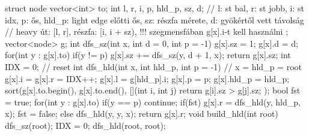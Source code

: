 struct node{
    vector<int> to;
    int l, r, i, p, hld_p, sz, d; // l: st bal, r: st jobb, i: st idx, p: ős, hld_p: light edge előtti ős, sz: részfa mérete, d: gyökértől vett távolság
    // heavy út: [l, r], részfa: [i, i + sz), !!! szegmensfában g[x].i-t kell használni
};
vector<node> g;
int dfs_sz(int x, int d = 0, int p = -1){
    g[x].sz = 1;
    g[x].d = d;
    for(int y : g[x].to) if(y != p) g[x].sz += dfs_sz(y, d + 1, x);
    return g[x].sz;
}
int IDX = 0; // reset
int dfs_hld(int x, int hld_p, int p = -1){ // x = hld_p = root
    g[x].i = g[x].r = IDX++;
    g[x].l = g[hld_p].i;
    g[x].p = p;
    g[x].hld_p = hld_p;
    sort(g[x].to.begin(), g[x].to.end(), [](int i, int j){ return g[i].sz > g[j].sz; });
    bool fst = true;
    for(int y : g[x].to){
        if(y == p) continue;
        if(fst) { g[x].r = dfs_hld(y, hld_p, x); fst = false; }
        else dfs_hld(y, y, x);
    }
    return g[x].r;
}
void build_hld(int root) { dfs_sz(root); IDX = 0; dfs_hld(root, root); }